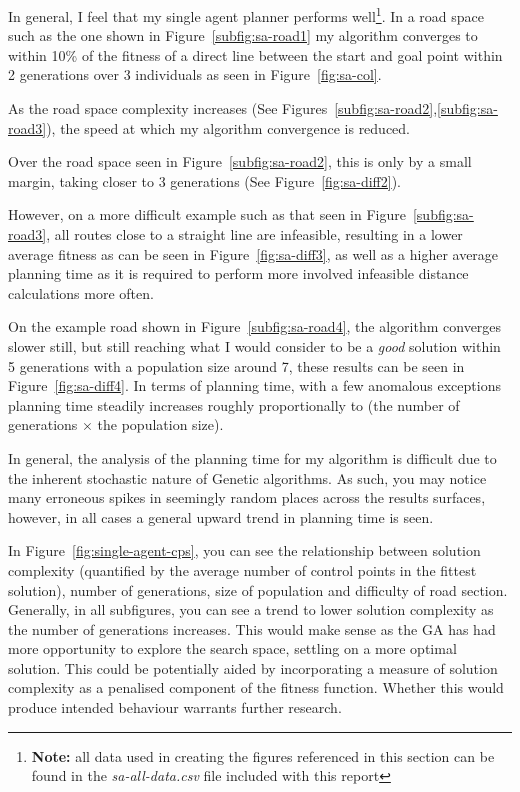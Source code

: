 In general, I feel that my single agent planner performs well\footnote{\textbf{Note:} all data used in creating the figures referenced in this section can be found in the \textit{sa-all-data.csv} file included with this report }. In a road space such as the one shown in Figure~\ref{subfig:sa-road1} my algorithm converges to within 10\% of the fitness of a direct line between the start and goal point within 2 generations over 3 individuals as seen in Figure~\ref{fig:sa-col}.

As the road space complexity increases (See Figures~\ref{subfig:sa-road2},\ref{subfig:sa-road3}), the speed at which my algorithm convergence is reduced.

Over the road space seen in Figure~\ref{subfig:sa-road2}, this is only by a small margin, taking closer to 3 generations (See Figure~\ref{fig:sa-diff2}).

However, on a more difficult example such as that seen in Figure~\ref{subfig:sa-road3}, all routes close to a straight line are infeasible, resulting in a lower average fitness as can be seen in Figure~\ref{fig:sa-diff3}, as well as a higher average planning time as it is required to perform more involved infeasible distance calculations more often.

On the example road shown in Figure~\ref{subfig:sa-road4}, the algorithm converges slower still, but still reaching what I would consider to be a \textit{good} solution within 5 generations with a population size around 7, these results can be seen in Figure~\ref{fig:sa-diff4}. In terms of planning time, with a few anomalous exceptions planning time steadily increases roughly proportionally to (the number of generations $\times$ the population size).

In general, the analysis of the planning time for my algorithm is difficult due to the inherent stochastic nature of Genetic algorithms. As such, you may notice many erroneous spikes in seemingly random places across the results surfaces, however, in all cases a general upward trend in planning time is seen.

In Figure~\ref{fig:single-agent-cps}, you can see the relationship between solution complexity (quantified by the average number of control points in the fittest solution), number of generations, size of population and difficulty of road section. Generally, in all subfigures, you can see a trend to lower solution complexity as the number of generations increases. This would make sense as the GA has had more opportunity to explore the search space, settling on a more optimal solution. This could be potentially aided by incorporating a measure of solution complexity as a penalised component of the fitness function. Whether this would produce intended behaviour warrants further research.

